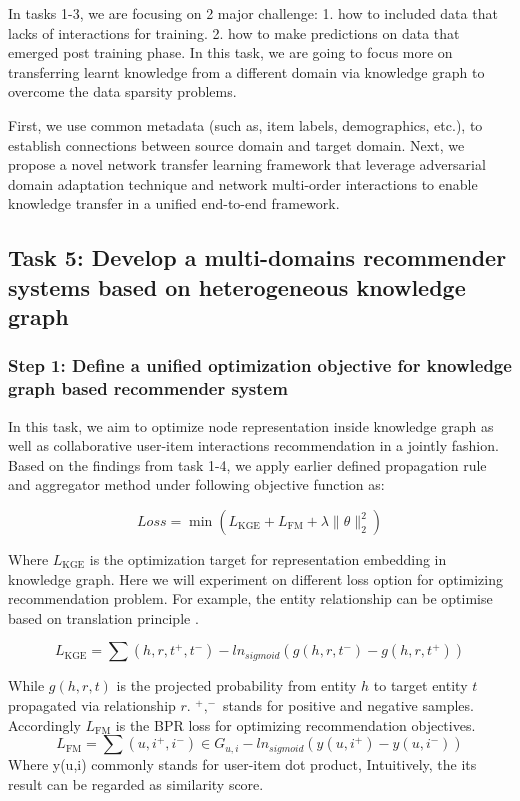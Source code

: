 In tasks 1-3, we are focusing on 2 major challenge: 1. how to included data that lacks of interactions for training. 2. how to make predictions on data that emerged post training phase. In this task, we are going to focus more on transferring learnt knowledge from a different domain via knowledge graph to overcome the data sparsity problems.

First, we use common metadata (such as, item labels, demographics, etc.), to establish connections between source domain and target domain. 
Next, we propose a novel network transfer learning framework that leverage  adversarial domain adaptation technique and network multi-order interactions to enable knowledge transfer in a unified end-to-end framework. 

\subsection*{Task 5: Develop a multi-domains recommender systems based on heterogeneous knowledge graph}

\subsubsection*{Step 1: Define a unified optimization objective for knowledge graph based recommender system}
In this task, we aim to optimize node representation inside knowledge graph as well as collaborative user-item interactions recommendation in a jointly fashion.
Based on the findings from task 1-4, we apply earlier defined propagation rule and aggregator method under following objective function as:

\begin{equation}
    Loss=\min{(L_\text{KGE}+L_\text{FM}+\lambda\|\theta\|^2_2)}
\end{equation}

Where $L_\text{KGE}$ is the optimization target for representation embedding in knowledge graph. Here we will experiment on different loss option for optimizing recommendation problem. For example, the entity relationship can be optimise based on translation principle \citep{lin2017learning}. 

\begin{equation}
    L_\text{KGE}=\sum{(h,r,t^+,t^-)} -ln_{sigmoid}(g(h,r,t^-)-g(h,r,t^+))
\end{equation}

While $g(h,r,t)$ is the projected probability from entity $h$ to target entity $t$ propagated via relationship $r$. $^+,^-$ stands for positive and negative samples. Accordingly $L_\text{FM}$ is the BPR \citep{rendle2012bpr} loss for optimizing recommendation objectives. 
\begin{equation}
    L_\text{FM}=\sum{(u,i^+,i^-) \in G_{u,i}} -ln_{sigmoid}(y(u,i^+)-y(u,i^-))
\end{equation}
Where y(u,i) commonly stands for user-item dot product, Intuitively, the its result can be regarded as similarity score.


